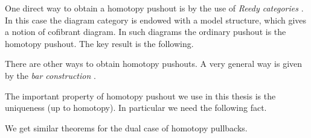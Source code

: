 One direct way to obtain a homotopy pushout is by the use of \emph{Reedy categories} \cite{hovey}. In this case the diagram category is endowed with a model structure, which gives a notion of cofibrant diagram. In such diagrams the ordinary pushout is the homotopy pushout. The key result is the following.


There are other ways to obtain homotopy pushouts. A very general way is given by the \emph{bar construction} \cite{riehl}. 

The important property of homotopy pushout we use in this thesis is the uniqueness (up to homotopy). In particular we need the following fact.


We get similar theorems for the dual case of homotopy pullbacks.
